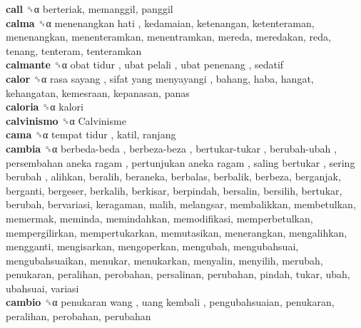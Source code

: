 \textbf{call} ␝α  berteriak, memanggil, panggil  \\
\textbf{calma} ␝α   menenangkan hati , kedamaian, ketenangan, ketenteraman, menenangkan, menenteramkan, menentramkan, mereda, meredakan, reda, tenang, tenteram, tenteramkan  \\
\textbf{calmante} ␝α   obat tidur ,  ubat pelali ,  ubat penenang , sedatif  \\
\textbf{calor} ␝α   rasa sayang ,  sifat yang menyayangi , bahang, haba, hangat, kehangatan, kemesraan, kepanasan, panas  \\
\textbf{caloria} ␝α  kalori  \\
\textbf{calvinismo} ␝α   Calvinisme   \\
\textbf{cama} ␝α   tempat tidur , katil, ranjang  \\
\textbf{cambia} ␝α   berbeda-beda ,  berbeza-beza ,  bertukar-tukar ,  berubah-ubah ,  persembahan aneka ragam ,  pertunjukan aneka ragam ,  saling bertukar ,  sering berubah , alihkan, beralih, beraneka, berbalas, berbalik, berbeza, berganjak, berganti, bergeser, berkalih, berkisar, berpindah, bersalin, bersilih, bertukar, berubah, bervariasi, keragaman, malih, melangsar, membalikkan, membetulkan, memermak, meminda, memindahkan, memodifikasi, memperbetulkan, mempergilirkan, mempertukarkan, memutasikan, menerangkan, mengalihkan, mengganti, mengisarkan, mengoperkan, mengubah, mengubahsuai, mengubahsuaikan, menukar, menukarkan, menyalin, menyilih, merubah, penukaran, peralihan, perobahan, persalinan, perubahan, pindah, tukar, ubah, ubahsuai, variasi  \\
\textbf{cambio} ␝α   penukaran wang ,  uang kembali , pengubahsuaian, penukaran, peralihan, perobahan, perubahan  \\
